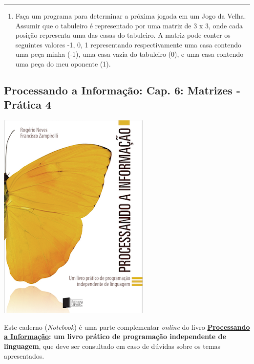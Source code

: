 \documentclass[12pt,a4paper]{article}
\renewcommand{\linethickness}{0.05em}
\providecommand{\tightlist}{%
      \setlength{\itemsep}{0pt}\setlength{\parskip}{0pt}}
\begin{document}
    \begin{center}\rule{0.5\linewidth}{\linethickness}\end{center}

\begin{enumerate}
\def\labelenumi{\arabic{enumi}.}
\setcounter{enumi}{7}
\tightlist
\item
  Faça um programa para determinar a próxima jogada em um Jogo da Velha.
  Assumir que o tabuleiro é representado por uma matriz de 3 x 3, onde
  cada posição representa uma das casas do tabuleiro. A matriz pode
  conter os seguintes valores -1, 0, 1 representando respectivamente uma
  casa contendo uma peça minha (-1), uma casa vazia do tabuleiro (0), e
  uma casa contendo uma peça do meu oponente (1).
\end{enumerate}

    \hypertarget{processando-a-informauxe7uxe3o-cap.-6-matrizes---pruxe1tica-4}{%
\subsection{Processando a Informação: Cap. 6: Matrizes - Prática
4}\label{processando-a-informauxe7uxe3o-cap.-6-matrizes---pruxe1tica-4}}

    \includegraphics{"figs/Capa_Processando_Informacao.jpg"}

Este caderno (\emph{Notebook}) é uma parte complementar \emph{online} do
livro
\textbf{\href{https://editora.ufabc.edu.br/matematica-e-ciencias-da-computacao/58-processando-a-informacao}{Processando
a Informação}: um livro prático de programação independente de
linguagem}, que deve ser consultado em caso de dúvidas sobre os temas
apresentados.
\end{document}
